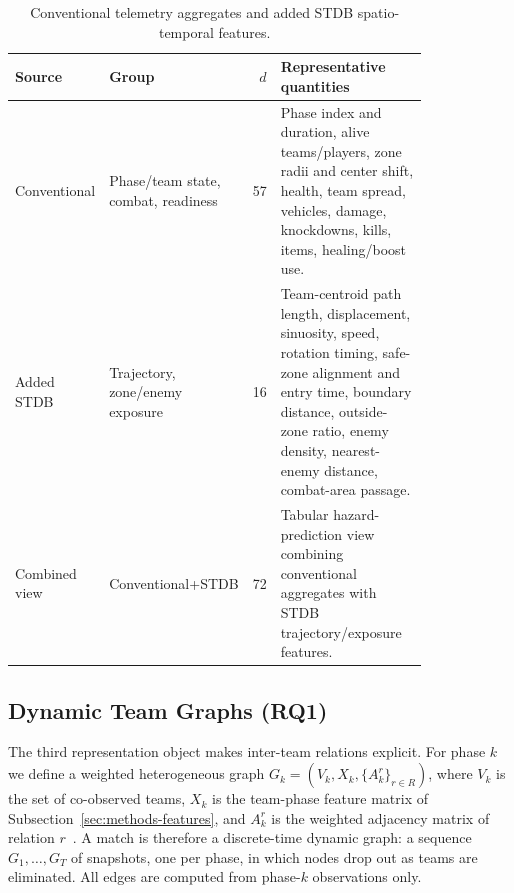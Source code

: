 \begin{table}[t]
\centering
\caption{Conventional telemetry aggregates and added STDB spatio-temporal
features.}
\label{tab:feature-groups}
\scriptsize
\setlength{\tabcolsep}{2.5pt}
\begin{tabular}{p{0.18\linewidth}p{0.22\linewidth}rp{0.42\linewidth}}
\toprule
Source & Group & \(d\) & Representative quantities \\
\midrule
Conventional & Phase/team state, combat, readiness & 57 &
Phase index and duration, alive teams/players, zone radii and center shift,
health, team spread, vehicles, damage, knockdowns, kills, items, healing/boost
use. \\
Added STDB & Trajectory, zone/enemy exposure & 16 &
Team-centroid path length, displacement, sinuosity, speed, rotation timing,
safe-zone alignment and entry time, boundary distance, outside-zone ratio,
enemy density, nearest-enemy distance, combat-area passage. \\
Combined view & Conventional+STDB & 72 &
Tabular hazard-prediction view combining conventional aggregates with STDB
trajectory/exposure features. \\
\bottomrule
\end{tabular}
\end{table}

\subsection{Dynamic Team Graphs (RQ1)}
\label{sec:team-graphs}

The third representation object makes inter-team relations explicit. For
phase \(k\) we define a weighted heterogeneous graph
\(G_k=(V_k,X_k,\{A_k^r\}_{r\in R})\), where \(V_k\) is the set of co-observed
teams, \(X_k\) is the team-phase feature matrix of
Subsection~\ref{sec:methods-features}, and \(A_k^r\) is the weighted
adjacency matrix of relation \(r\)~\cite{sanchezLengeling2021gnnIntro}. A
match is therefore a discrete-time dynamic graph: a sequence
\(G_1,\dots,G_T\) of snapshots, one per phase, in which nodes drop out as
teams are eliminated. All edges are computed from phase-\(k\) observations
only.

